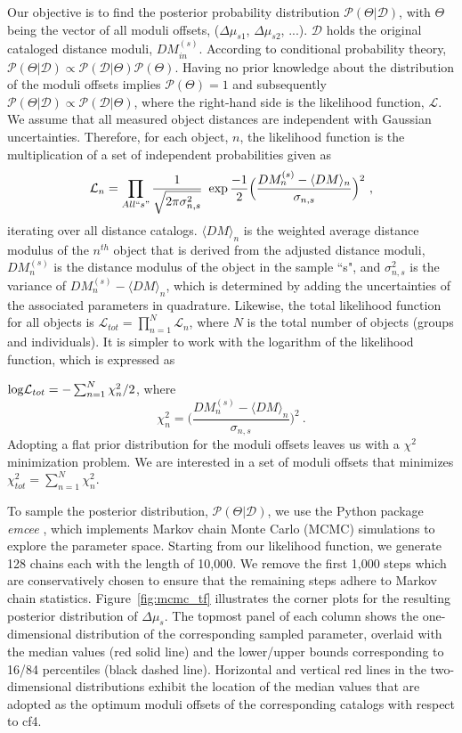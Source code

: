 \documentclass[twocolumn]{aastex63}
\newcommand{\Pc}{\mathcal{P}}
\newcommand{\Dc}{\mathcal{D}}
\newcommand{\Lc}{\mathcal{L}}
\begin{document}
Our objective is to find the posterior probability distribution $\Pc(\Theta|\mathcal{D})$, with $\Theta$ being the vector of all moduli offsets, ($\Delta \mu_{s1}$, $\Delta \mu_{s2}$, ...). $\Dc$ holds the original cataloged distance moduli, $DM_{in}^{(s)}$. According to conditional probability theory, $\Pc(\Theta|\mathcal{D}) \propto \Pc(\mathcal{D}|\Theta)\Pc(\Theta)$. Having no prior knowledge about the distribution of the moduli offsets implies $\Pc(\Theta)=1$ and subsequently $\Pc(\Theta|\mathcal{D}) \propto \Pc(\mathcal{D}|\Theta)$, where the right-hand side is the likelihood function, $\Lc$.
We assume that all measured object distances are independent with Gaussian uncertainties. Therefore, for each object, $n$, the likelihood function is the multiplication of a set of independent probabilities given as  
\begin{equation}
\label{Eq:likelihood}
\Lc_n= \prod_{All ``s"} \frac{1}{\sqrt{2 \pi \sigma_{n,s}^2}} ~\exp\frac{-1}{2}\Big(\frac{DM_n^{(s)} - \langle DM \rangle_n}{\sigma_{n,s}}  \Big)^2 ~,
\end{equation}
iterating over all distance catalogs. 
$\langle DM \rangle_n$ is the weighted average distance modulus of the $n^{th}$ object that is derived from the adjusted distance moduli, $DM_n^{(s)}$ is the distance modulus of the object in the sample ``s", and $\sigma^2_{n,s}$ is the variance of $DM_n^{(s)} - \langle DM \rangle_n$, which is determined by adding the uncertainties of the associated parameters in quadrature. Likewise, the total likelihood function for all objects is $\Lc_{tot}=\prod_{n=1}^N\Lc_n$, where $N$ is the total number of objects (groups and individuals).
It is simpler to work with the logarithm of the likelihood function, which is expressed as 

${\rm log} \Lc_{tot} = -\sum_{n=1}^N \chi_n^2/2 $, where 
\begin{equation}
\chi^2_n = \Big(\frac{DM_n^{(s)} - \langle DM \rangle_n}{\sigma_{n,s}}  \Big)^2~.
\end{equation}
Adopting a flat prior distribution for the moduli offsets leaves us with a $\chi^2$ minimization problem. We are interested in a set of moduli offsets that minimizes $\chi^2_{tot}=\sum_{n=1}^N \chi_n^2$.

To sample the posterior distribution, $\Pc(\Theta|\mathcal{D})$, we use the Python package {\it emcee} \citep{2013PASP..125..306F}, which implements Markov chain Monte Carlo (MCMC) simulations to explore the parameter space. Starting from our likelihood function, we generate 128 chains each with the length of 10,000. We remove the first 1,000 steps which are conservatively chosen to ensure that the remaining steps adhere to Markov chain statistics. Figure~\ref{fig:mcmc_tf} illustrates the corner plots for the resulting posterior distribution of $\Delta \mu_{s}$. The topmost panel of each column shows the one-dimensional distribution of the corresponding sampled parameter, overlaid with the median values (red solid line) and the lower/upper bounds corresponding to 16/84 percentiles (black dashed line). Horizontal and vertical red lines in the two-dimensional distributions exhibit the location of the median values that are adopted as the optimum moduli offsets of the corresponding catalogs with respect to cf4.
\end{document}

